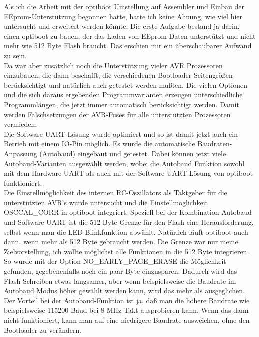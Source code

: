 Als ich die Arbeit mit der optiboot Umstellung auf Assembler und Einbau der EEprom-Unterstützung
begonnen hatte, hatte ich keine Ahnung, wie viel hier untersucht und erweitert werden könnte.
Die erste Aufgabe bestand ja darin, einen optiboot zu bauen, der das Laden von EEprom Daten unterstützt
und nicht mehr wie 512 Byte Flash braucht. Das erschien mir ein überschaubarer Aufwand zu sein.\\

Da war aber zusätzlich noch die Unterstützung vieler AVR Prozessoren einzubauen,
die dann beschafft, die verschiedenen Bootloader-Seitengrößen berücksichtigt und natürlich auch getestet werden mußten.
Die vielen Optionen und die sich daraus ergebenden Programmvarianten erzeugen unterschiedliche Programmlängen,
die jetzt immer automatisch berücksichtigt werden.
Damit werden Falschsetzungen der AVR-Fuses für alle unterstützten Prozessoren vermieden.\\

Die Software-UART Lösung wurde optimiert und so ist damit jetzt auch ein Betrieb mit einem IO-Pin möglich.
Es wurde die automatische Baudraten-Anpassung (Autobaud) eingebaut und getestet.
Dabei können jetzt viele Autobaud-Varianten ausgewählt werden, wobei die Autobaud Funktion
sowohl mit dem Hardware-UART als auch mit der Software-UART Lösung von optiboot funktioniert.\\

Die Einstellmöglichkeit des internen RC-Oszillators als Taktgeber für die unterstützten AVR's
wurde untersucht und die Einstellmöglichkeit OSCCAL\_CORR in optiboot integriert.
Speziell bei der Kombination Autobaud und Software-UART ist die 512 Byte Grenze für den Flash eine Herausforderung,
selbst wenn man die LED-Blinkfunktion abwählt.
Natürlich läuft optiboot auch dann, wenn mehr als 512 Byte gebraucht werden. Die Grenze war nur meine Zielvorstellung,
ich wollte möglichst alle Funktionen in die 512 Byte integrieren.
So wurde mit der Option NO\_EARLY\_PAGE\_ERASE die Möglichkeit gefunden, gegebenenfalls noch ein paar Byte einzusparen.
Dadurch wird das Flash-Schreiben etwas langsamer, aber wenn beispielsweise die Baudrate 
im Autobaud Modus höher gewählt werden kann, wird das mehr als ausgeglichen. Der Vorteil bei der
Autobaud-Funktion ist ja, daß man die höhere Baudrate wie beispielsweise 115200 Baud bei 8 MHz Takt
ausprobieren kann. Wenn das dann nicht funktioniert, kann man auf eine niedrigere Baudrate ausweichen,
ohne den Bootloader zu verändern.\\

